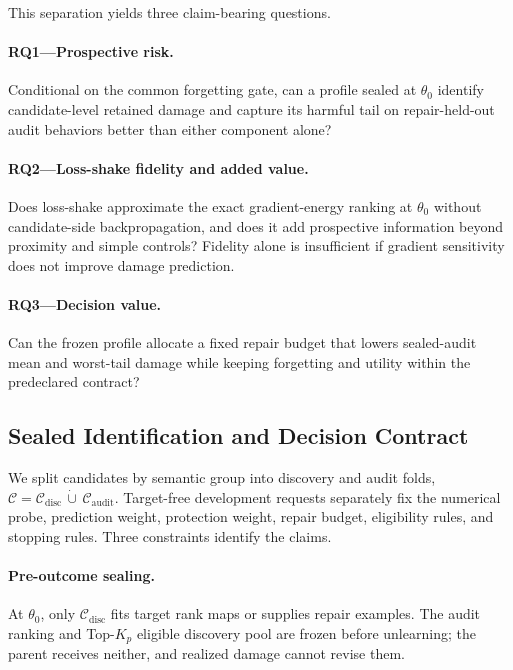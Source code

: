 This separation yields three claim-bearing questions.

\paragraph{RQ1---Prospective risk.}
Conditional on the common forgetting gate, can a profile sealed at $\theta_0$
identify candidate-level retained damage and capture its harmful tail on
repair-held-out audit behaviors better than either component alone?

\paragraph{RQ2---Loss-shake fidelity and added value.}
Does loss-shake approximate the exact gradient-energy ranking at $\theta_0$
without candidate-side backpropagation, and does it add prospective
information beyond proximity and simple controls? Fidelity alone is
insufficient if gradient sensitivity does not improve damage prediction.

\paragraph{RQ3---Decision value.}
Can the frozen profile allocate a fixed repair budget that lowers sealed-audit
mean and worst-tail damage while keeping forgetting and utility within the
predeclared contract?

\subsection{Sealed Identification and Decision Contract}
\label{sec:setup-protection}

We split candidates by semantic group into discovery and audit folds,
$\mathcal C=\mathcal C_{\mathrm{disc}}\,\dot\cup\,
\mathcal C_{\mathrm{audit}}$. Target-free development requests separately fix
the numerical probe, prediction weight, protection weight, repair budget,
eligibility rules, and stopping rules. Three constraints identify the claims.

\paragraph{Pre-outcome sealing.}
At $\theta_0$, only $\mathcal C_{\mathrm{disc}}$ fits target rank maps or
supplies repair examples. The audit ranking and Top-$K_p$ eligible discovery
pool are frozen before unlearning; the parent receives neither, and realized
damage cannot revise them.

